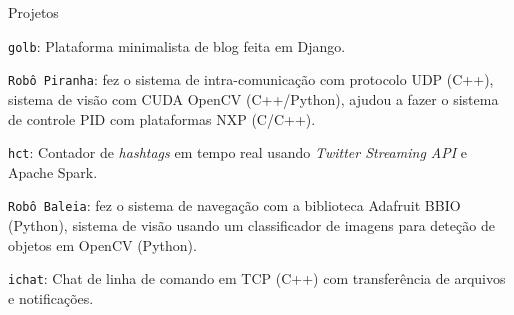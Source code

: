 \documentclass[8pt]{resume}
\newcommand{\tit}[1]{\textit{#1}}
\newcommand{\ttt}[1]{\texttt{#1}}
\begin{document}
\begin{rSection}{Projetos}

\begin{rSubsection}{}{}{}{}
    \item \ttt{golb}: Plataforma minimalista de blog feita em Django.
    \item \ttt{Robô Piranha}:
        fez o sistema de intra-comunicação com protocolo UDP (C++),
        sistema de visão com CUDA OpenCV (C++/Python),
        ajudou a fazer o sistema de controle PID com plataformas NXP (C/C++).
    \item \ttt{hct}: Contador de \tit{hashtags} em tempo real usando
        \tit{Twitter Streaming API} e Apache Spark.
    \item \ttt{Robô Baleia}:
        fez o sistema de navegação com a biblioteca Adafruit BBIO (Python),
        sistema de visão usando um classificador de imagens para deteção
        de objetos em OpenCV (Python).
    \item \ttt{ichat}: Chat de linha de comando em TCP (C++) com transferência
        de arquivos e notificações.
\end{rSubsection}

\end{rSection}
\end{document}
